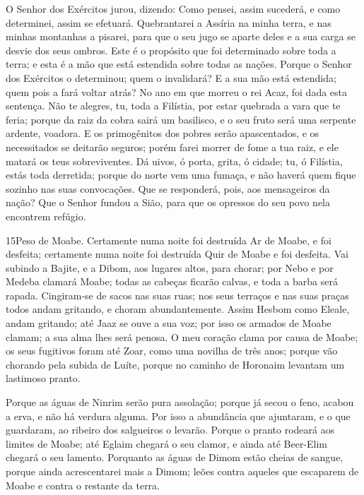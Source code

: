 O Senhor dos Exércitos jurou, dizendo: Como pensei, assim
sucederá, e como determinei, assim se efetuará. Quebrantarei
a Assíria na minha terra, e nas minhas montanhas a pisarei, para que
o seu jugo se aparte deles e a sua carga se desvie dos seus ombros.
Este é o propósito que foi determinado sobre toda a terra; e
esta é a mão que está estendida sobre todas as nações. Porque
o Senhor dos Exércitos o determinou; quem o invalidará? E a sua mão
está estendida; quem pois a fará voltar atrás? No ano em que
morreu o rei Acaz, foi dada esta sentença. Não te alegres,
tu, toda a Filístia, por estar quebrada a vara que te feria; porque
da raiz da cobra sairá um basilisco, e o seu fruto será uma serpente
ardente, voadora. E os primogênitos dos pobres serão
apascentados, e os necessitados se deitarão seguros; porém farei
morrer de fome a tua raiz, e ele matará os teus sobreviventes.
Dá uivos, ó porta, grita, ó cidade; tu, ó Filístia, estás
toda derretida; porque do norte vem uma fumaça, e não haverá quem
fique sozinho nas suas convocações. Que se responderá, pois,
aos mensageiros da nação? Que o Senhor fundou a Sião, para que os
opressos do seu povo nela encontrem refúgio.

\medskip

\lettrine{15}{}Peso de Moabe. Certamente numa noite foi
destruída Ar de Moabe, e foi desfeita; certamente numa noite foi
destruída Quir de Moabe e foi desfeita. Vai subindo a Bajite, e
a Dibom, aos lugares altos, para chorar; por Nebo e por Medeba
clamará Moabe; todas as cabeças ficarão calvas, e toda a barba será
rapada. Cingiram-se de sacos nas suas ruas; nos seus terraços e
nas suas praças todos andam gritando, e choram abundantemente.
Assim Hesbom como Eleale, andam gritando; até Jaaz se ouve a sua
voz; por isso os armados de Moabe clamam; a sua alma lhes será
penosa. O meu coração clama por causa de Moabe; os seus
fugitivos foram até Zoar, como uma novilha de três anos; porque vão
chorando pela subida de Luíte, porque no caminho de Horonaim
levantam um lastimoso pranto.

Porque as águas de Ninrim serão pura assolação; porque já secou o
feno, acabou a erva, e não há verdura alguma. Por isso a
abundância que ajuntaram, e o que guardaram, ao ribeiro dos
salgueiros o levarão. Porque o pranto rodeará aos limites de
Moabe; até Eglaim chegará o seu clamor, e ainda até Beer-Elim
chegará o seu lamento. Porquanto as águas de Dimom estão cheias
de sangue, porque ainda acrescentarei mais a Dimom; leões contra
aqueles que escaparem de Moabe e contra o restante da terra.

